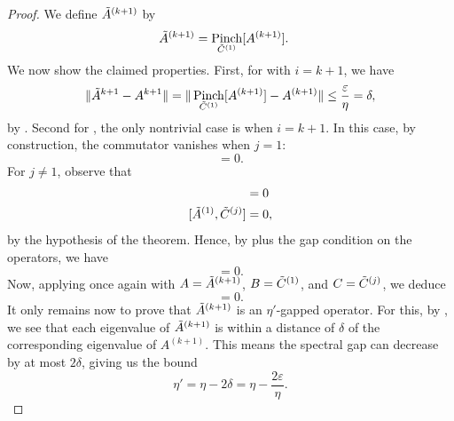 \documentclass[11pt]{article}
\theoremstyle{plain}
\DeclareMathOperator{\Pinch}{Pinch}
\newcommand{\eps}{\varepsilon}
\begin{document}
\begin{proof}
    We define $\tilde{A}^{(k+1)}$ by
    \begin{align}
        \tdA^{(k+1)} &= \Pinch_{\tdC^{(1)}}[A^{(k+1)}]. 
    \end{align}
    We now show the claimed properties. First, for  with $i=k+1$, we have 
    \begin{equation}
        \| \tdA^{k+1} - A^{k+1} \| = \| \Pinch_{\tdC^{(1)}}[A^{(k+1)}] - A^{(k+1)} \| \leq \frac{\eps}{\eta} = \delta, 
    \end{equation}
    by .
    Second for , the only nontrivial case is when $i = k+1$. In this case, by construction, the commutator vanishes when $j = 1$:
    \begin{equation}
        [\tdA^{(k+1)}, \tdC^{(1)}] = 0. 
    \end{equation}
    For $j \neq 1$, observe that
    \begin{align}
        [\tdC^{(1)}, \tdA^{(1)}] &= 0 \\
        [\tdA^{(1)}, \tdC^{(j)}] &= 0,
    \end{align}
    by the hypothesis of the theorem. Hence, by  plus the gap condition on the operators, we have
    \begin{equation}
        [\tdC^{(1)}, \tdC^{(j)}] = 0.
    \end{equation}
    Now, applying  once again with $A = \tilde{A}^{(k+1)}$, $B = \tilde{C}^{(1)}$, and $C = \tilde{C}^{(j)}$, we deduce
    \begin{equation}
        [\tdA^{(k+1)}, \tdC^{(j)}] = 0.
    \end{equation}
    It only remains now to prove that $\tilde{A}^{(k+1)}$ is an $\eta'$-gapped operator. For this, by , we see that each eigenvalue of $\tilde{A}^{(k+1)}$ is within a distance of $\delta$ of the corresponding eigenvalue of $A^{(k+1)}$. This means the spectral gap can decrease by at most $2\delta$, giving us the bound
    \begin{equation}
        \eta' = \eta - 2\delta = \eta - \frac{2\eps}{\eta}. 
    \end{equation}
    
\end{proof}



\newpage
\end{document}
